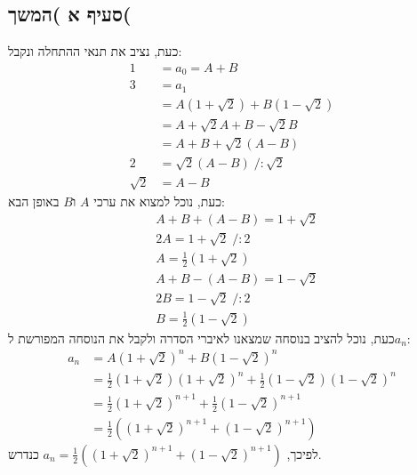 \documentclass[11pt, oneside]{article}
\newcommand{\qed}{\R{$\blacksquare$}}
\newcommand{\br}{\\\\\\\\\\\\\\}
\begin{document}
\subsection{סעיף א )המשך(}
כעת, נציב את תנאי ההתחלה ונקבל:
\begin{align*}
1 & = a_0 = A + B\\
3
& = a_1\\
& = A(1 + \sqrt{2}) + B(1 - \sqrt{2})\\
& = A + \sqrt{2}A + B - \sqrt{2}B\\
& = A + B + \sqrt{2}(A - B)\\
2 & = \sqrt{2}(A - B)\;/:\sqrt{2}\\
\sqrt{2} & = A - B
\end{align*}
כעת, נוכל למצוא את ערכי $A$ ו$B$ באופן הבא:
\begin{align*}
& A + B + (A - B) = 1 + \sqrt{2}\\
& 2A = 1 + \sqrt{2}\;/:2\\
& A = \frac{1}{2}(1 + \sqrt{2})\\
& A + B - (A - B) = 1 - \sqrt{2}\\
& 2B = 1 - \sqrt{2}\;/:2\\
& B = \frac{1}{2}(1 - \sqrt{2})
\end{align*}
כעת, נוכל להציב בנוסחה שמצאנו לאיברי הסדרה ולקבל את הנוסחה המפורשת ל$a_n$:
\begin{align*}
a_n
& = A(1 + \sqrt{2})^n + B(1 - \sqrt{2})^n\\
& = \frac{1}{2}(1 + \sqrt{2})(1 + \sqrt{2})^n + \frac{1}{2}(1 - \sqrt{2})(1 - \sqrt{2})^n\\
& = \frac{1}{2}(1 + \sqrt{2})^{n + 1} + \frac{1}{2}(1 - \sqrt{2})^{n + 1}\\
& = \frac{1}{2}((1 + \sqrt{2})^{n + 1} + (1 - \sqrt{2})^{n + 1})
\end{align*}
לפיכך, $a_n = \frac{1}{2}((1 + \sqrt{2})^{n + 1} + (1 - \sqrt{2})^{n + 1})$ כנדרש.
\br\qed
\clearpage

\end{document}
